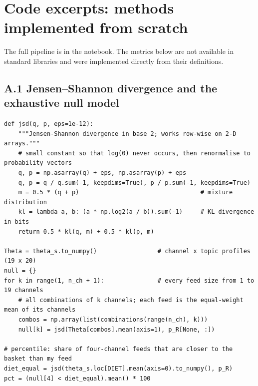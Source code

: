\documentclass[11pt,a4paper]{article}
\begin{document}
\appendix
\section{Code excerpts: methods implemented from scratch}
\label{app:code}
The full pipeline is in the notebook. The metrics below are not available in standard libraries and were implemented directly from their definitions.

\subsection*{A.1 Jensen--Shannon divergence and the exhaustive null model}
\vspace{4pt}
\begin{lstlisting}
def jsd(q, p, eps=1e-12):
    """Jensen-Shannon divergence in base 2; works row-wise on 2-D arrays."""
    # small constant so that log(0) never occurs, then renormalise to probability vectors
    q, p = np.asarray(q) + eps, np.asarray(p) + eps
    q, p = q / q.sum(-1, keepdims=True), p / p.sum(-1, keepdims=True)
    m = 0.5 * (q + p)                                  # mixture distribution
    kl = lambda a, b: (a * np.log2(a / b)).sum(-1)     # KL divergence in bits
    return 0.5 * kl(q, m) + 0.5 * kl(p, m)

Theta = theta_s.to_numpy()                 # channel x topic profiles (19 x 20)
null = {}
for k in range(1, n_ch + 1):               # every feed size from 1 to 19 channels
    # all combinations of k channels; each feed is the equal-weight mean of its channels
    combos = np.array(list(combinations(range(n_ch), k)))
    null[k] = jsd(Theta[combos].mean(axis=1), p_R[None, :])

# percentile: share of four-channel feeds that are closer to the basket than my feed
diet_equal = jsd(theta_s.loc[DIET].mean(axis=0).to_numpy(), p_R)
pct = (null[4] < diet_equal).mean() * 100
\end{lstlisting}
\end{document}
